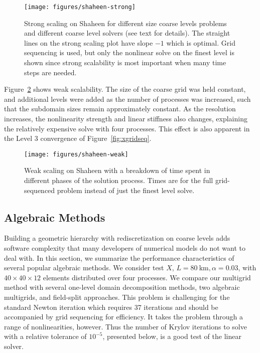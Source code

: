 \documentclass[draft,lineno,jgrga]{AGUTeX}
\begin{document}
\begin{article}
\begin{figure}
  \texttt{[image: figures/shaheen-strong]}
  \centering\caption{Strong scaling on Shaheen for different size coarse levels problems and different coarse level solvers (see text for details).
    The straight lines on the strong scaling plot have slope $-1$ which is optimal.
    Grid sequencing is used, but only the nonlinear solve on the finest level is shown since strong scalability is most important when many time steps are needed.}\label{fig:shaheen-strong}
\end{figure}

Figure~\ref{fig:shaheen-weak} shows weak scalability.
The size of the coarse grid was held constant, and additional levels were added as the number of processes was increased, such that the subdomain sizes remain approximately constant.
As the resolution increases, the nonlinearity strength and linear stiffness also changes, explaining the relatively expensive solve with four processes.
This effect is also apparent in the Level 3 convergence of Figure~\ref{fig:xgridseq}.

\begin{figure}
  \texttt{[image: figures/shaheen-weak]}
  \centering\caption{Weak scaling on Shaheen with a breakdown of time spent in different phases of the solution process.
    Times are for the full grid-sequenced problem instead of just the finest level solve.}\label{fig:shaheen-weak}
\end{figure}

\subsection{Algebraic Methods}\label{sec:1level}
Building a geometric hierarchy with rediscretization on coarse levels adds software complexity that many developers of numerical models do not want to deal with.  In this section, we summarize the performance characteristics of several popular algebraic methods.  We consider test $X$, $L = \SI{80}{\kilo\metre}, \alpha=0.03$, with $40\times 40\times 12$ elements distributed over four processes. We compare our multigrid method with several one-level domain decomposition methods, two algebraic multigrids, and field-split approaches. This problem is challenging for the standard Newton iteration which requires 37 iterations and should be accompanied by grid sequencing for efficiency. It takes the problem through a range of nonlinearities, however. Thus the number of Krylov iterations to solve with a relative tolerance of $10^{-5}$, presented below, is a good test of the linear solver.


\end{article}
\end{document}

